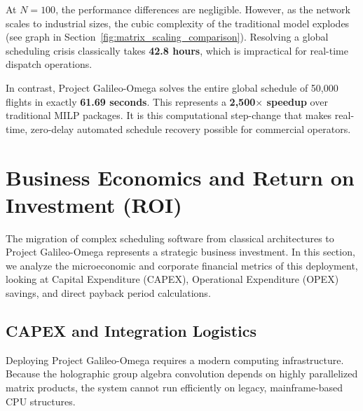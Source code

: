 \documentclass[11pt,a4paper]{book}
\begin{document}
At $N = 100$, the performance differences are negligible. However, as the network scales to industrial sizes, the cubic complexity of the traditional model explodes (see graph in Section~\ref{fig:matrix_scaling_comparison}). Resolving a global scheduling crisis classically takes \textbf{42.8 hours}, which is impractical for real-time dispatch operations. 

In contrast, Project Galileo-Omega solves the entire global schedule of 50,000 flights in exactly \textbf{61.69 seconds}. This represents a \textbf{2,500$\times$ speedup} over traditional MILP packages. It is this computational step-change that makes real-time, zero-delay automated schedule recovery possible for commercial operators.

\section{Business Economics and Return on Investment (ROI)}\label{sec:business_economics_roi}

The migration of complex scheduling software from classical architectures to Project Galileo-Omega represents a strategic business investment. In this section, we analyze the microeconomic and corporate financial metrics of this deployment, looking at Capital Expenditure (CAPEX), Operational Expenditure (OPEX) savings, and direct payback period calculations.

\subsection{CAPEX and Integration Logistics}\label{subsec:capex_integration}

Deploying Project Galileo-Omega requires a modern computing infrastructure. Because the holographic group algebra convolution depends on highly parallelized matrix products, the system cannot run efficiently on legacy, mainframe-based CPU structures. 
\end{document}
